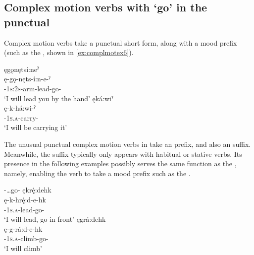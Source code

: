 \subsection{Complex motion verbs with  ‘go’ in the punctual} \label{ch:Complex motion verbs in the punctual aspect}
Complex motion verbs take a punctual short  form, along with a mood prefix (such as the \textsc{\future}, shown in \ref{ex:complmotex6}).

\ea\label{ex:complmotex6}
\ea ęgǫnętsí:neˀ\\
\gll ę-gǫ-nęts-í:n-e-ˀ\\
 \fut-\textsc{1s:2s}-arm-lead-go-{\punctual}\\
\glt `I will lead you by the hand'
\ex ęká:wiˀ\\
\gll ę-k-há:wi-ˀ\\
 \fut-\textsc{1s.a}-carry-{\punctual}\footnotemark{}\\
\glt `I will be carrying it'
\z
\z

The unusual punctual complex motion verbs in  take an  \textsc{\future} prefix, and also  an  \textsc{\former} suffix. Meanwhile, the \textsc{\former} suffix typically only appears with habitual or stative verbs. Its presence in the following examples possibly serves the same function as the  \textsc{\modalizer}, namely, enabling the verb to take a mood prefix such as the  \textsc{\future}.

\ea\label{ex:complmotex7}  {\future}-…go-{\former}
\ea ękrę́:dehk\\
\gll ę-k-hrę́:d-e-hk\\
 \fut-\textsc{1s.a}-lead-go-{\former}\\
\glt `I will lead, go in front'
\ex ęgrá:dehk\\
\gll ę-g-rá:d-e-hk\\
 \fut-\textsc{1s.a}-climb-go-{\former}\\
\glt `I will climb'
\z
\z

